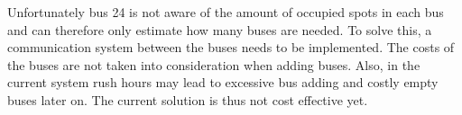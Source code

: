\documentclass[a4paper]{article}
\begin{document}
Unfortunately bus 24 is not aware of the amount of occupied spots in each bus and can therefore only estimate how many buses are needed. To solve this, a communication system between the buses needs to be implemented. The costs of the buses are not taken into consideration when adding buses. Also, in the current system rush hours may lead to excessive bus adding and costly empty buses later on. The current solution is thus not cost effective yet.
\end{document}
